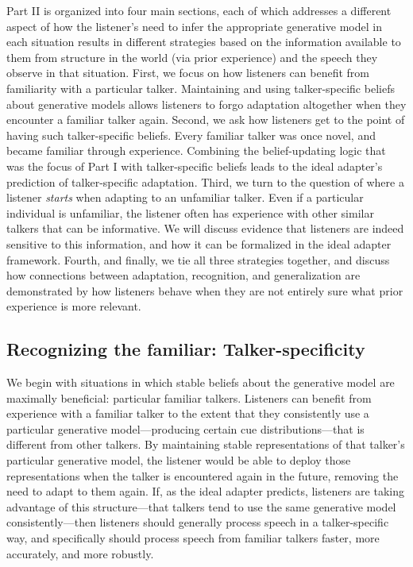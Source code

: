 Part II is organized into four main sections, each of which addresses a different aspect of how the listener's need to infer the appropriate generative model in each situation results in different strategies based on the information available to them from structure in the world (via prior experience) and the speech they observe in that situation.  First, we focus on how listeners can benefit from familiarity with a particular talker.  Maintaining and using talker-specific beliefs about generative models allows listeners to forgo adaptation altogether when they encounter a familiar talker again.  Second, we ask how listeners get to the point of having such talker-specific beliefs.  Every familiar talker was once novel, and became familiar through experience.  Combining the belief-updating logic that was the focus of Part I with talker-specific beliefs leads to the ideal adapter's prediction of talker-specific adaptation.  Third, we turn to the question of where a listener \emph{starts} when adapting to an unfamiliar talker.  Even if a particular individual is unfamiliar, the listener often has experience with other similar talkers that can be informative.  We will discuss evidence that listeners are indeed sensitive to this information, and how it can be formalized in the ideal adapter framework.  Fourth, and finally, we tie all three strategies together, and discuss how connections between adaptation, recognition, and generalization are demonstrated by how listeners behave when they are not entirely sure what prior experience is more relevant.  


\subsection{Recognizing the familiar: Talker-specificity}
\label{sec:recogn-famil-talk}


We begin with situations in which stable beliefs about the generative model are maximally beneficial: particular familiar talkers.  Listeners can benefit from experience with a familiar talker to the extent that they consistently use a particular generative model---producing certain cue distributions---that is different from other talkers.  By maintaining stable representations of that talker's particular generative model, the listener would be able to deploy those representations when the talker is encountered again in the future, removing the need to adapt to them again.  If, as the ideal adapter predicts, listeners are taking advantage of this structure---that talkers tend to use the same generative model consistently---then listeners should generally process speech in a talker-specific way, and specifically should process speech from familiar talkers faster, more accurately, and more robustly.

